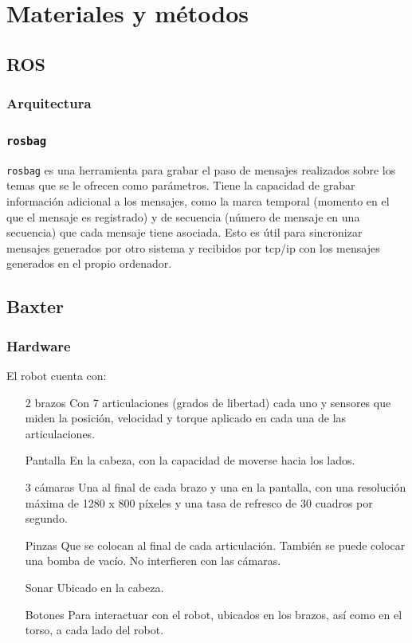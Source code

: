 \chapter{Materiales y métodos}
\section{ROS}
\subsection{Arquitectura}
\subsection{\texttt{rosbag}}
\label{subsec:metodos/rosbag}
\verb|rosbag| es una herramienta para grabar el paso de mensajes realizados sobre los temas que se le ofrecen como parámetros. Tiene la capacidad de grabar información adicional a los mensajes, como la marca temporal (momento en el que el mensaje es registrado) y de secuencia (número de mensaje en una secuencia) que cada mensaje tiene asociada. Esto es útil para sincronizar mensajes generados por otro sistema y recibidos por tcp/ip con los mensajes generados en el propio ordenador.
\section{Baxter}
\subsection{Hardware}
El robot cuenta con:

\begin{itemize}
\item [2 brazos] Con 7 articulaciones (grados de libertad) cada uno y sensores que miden la posición, velocidad y torque aplicado en cada una de las articulaciones.
\item [Pantalla] En la cabeza, con la capacidad de moverse hacia los lados.
\item [3 cámaras] Una al final de cada brazo y una en la pantalla, con una resolución máxima de 1280 x 800 píxeles y una tasa de refresco de 30 cuadros por segundo. 
\item [Pinzas] Que se colocan al final de cada articulación. También se puede colocar una bomba de vacío. No interfieren con las cámaras.
\item [Sonar] Ubicado en la cabeza.
\item [Botones] Para interactuar con el robot, ubicados en los brazos, así como en el torso, a cada lado del robot.
\item []
\end{itemize}

